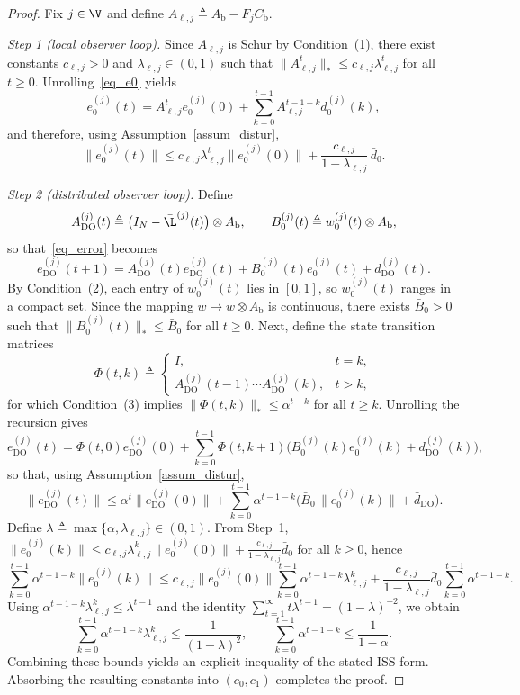 \begin{proof}
Fix $j\in\V$ and define $A_{\ell,j}\triangleq A_{\text{b}}-F_jC_{\text{b}}$.

\textit{Step 1 (local observer loop).}
Since $A_{\ell,j}$ is Schur by Condition~(1), there exist constants $c_{\ell,j}>0$ and $\lambda_{\ell,j}\in(0,1)$ such that $\|A_{\ell,j}^t\|_* \le c_{\ell,j}\lambda_{\ell,j}^t$ for all $t\ge 0$.
Unrolling~\eqref{eq_e0} yields
\[
e_0^{(j)}(t)=A_{\ell,j}^t e_0^{(j)}(0)+\sum_{k=0}^{t-1}A_{\ell,j}^{t-1-k} d_0^{(j)}(k),
\]
and therefore, using Assumption~\ref{assum_distur},
\[
\|e_0^{(j)}(t)\|
\le c_{\ell,j}\lambda_{\ell,j}^t\|e_0^{(j)}(0)\|+\frac{c_{\ell,j}}{1-\lambda_{\ell,j}}\,\bar d_{0}.
\]

\textit{Step 2 (distributed observer loop).}
Define
\[
A_{\mathrm{DO}}^{(j)}(t)\triangleq \big(I_N-\bar{\L}^{(j)}(t)\big)\otimes A_{\text{b}},\qquad
B_{0}^{(j)}(t)\triangleq w_0^{(j)}(t)\otimes A_{\text{b}},
\]
so that~\eqref{eq_error} becomes
\[
e_{\mathrm{DO}}^{(j)}(t+1)=A_{\mathrm{DO}}^{(j)}(t)e_{\mathrm{DO}}^{(j)}(t)+B_{0}^{(j)}(t)e_0^{(j)}(t)+d_{\mathrm{DO}}^{(j)}(t).
\]
By Condition~(2), each entry of $w_0^{(j)}(t)$ lies in $[0,1]$, so $w_0^{(j)}(t)$ ranges in a compact set.
Since the mapping $w\mapsto w\otimes A_{\text{b}}$ is continuous, there exists $\bar B_0>0$ such that $\|B_0^{(j)}(t)\|_*\le \bar B_0$ for all $t\ge 0$.
Next, define the state transition matrices
\[
\Phi(t,k)\triangleq
\begin{cases}
I, & t=k,\\
A_{\mathrm{DO}}^{(j)}(t-1)\cdots A_{\mathrm{DO}}^{(j)}(k), & t>k,
\end{cases}
\]
for which Condition~(3) implies $\|\Phi(t,k)\|_* \le \alpha^{t-k}$ for all $t\ge k$.
Unrolling the recursion gives
\[
e_{\mathrm{DO}}^{(j)}(t)=\Phi(t,0)e_{\mathrm{DO}}^{(j)}(0)+\sum_{k=0}^{t-1}\Phi(t,k+1)\Big(B_{0}^{(j)}(k)e_0^{(j)}(k)+d_{\mathrm{DO}}^{(j)}(k)\Big),
\]
so that, using Assumption~\ref{assum_distur},
\[
\|e_{\mathrm{DO}}^{(j)}(t)\|
\le \alpha^t\|e_{\mathrm{DO}}^{(j)}(0)\|
\!+\!\sum_{k=0}^{t-1}\alpha^{t-1-k}\Big(\bar B_0\,\|e_0^{(j)}(k)\|+\bar d_{\mathrm{DO}}\Big).
\]
Define $\lambda\triangleq \max\{\alpha,\lambda_{\ell,j}\}\in(0,1)$.
From Step~1, $\|e_0^{(j)}(k)\|\le c_{\ell,j}\lambda_{\ell,j}^k\|e_0^{(j)}(0)\|+\frac{c_{\ell,j}}{1-\lambda_{\ell,j}}\bar d_{0}$ for all $k\ge 0$, hence
\[
\sum_{k=0}^{t-1}\alpha^{t-1-k}\|e_0^{(j)}(k)\|
\le c_{\ell,j}\|e_0^{(j)}(0)\|\sum_{k=0}^{t-1}\alpha^{t-1-k}\lambda_{\ell,j}^k
\!+\!\frac{c_{\ell,j}}{1-\lambda_{\ell,j}}\bar d_{0}\sum_{k=0}^{t-1}\alpha^{t-1-k}.
\]
Using $\alpha^{t-1-k}\lambda_{\ell,j}^k\le \lambda^{t-1}$ and the identity $\sum_{t=1}^{\infty} t\lambda^{t-1}=(1-\lambda)^{-2}$, we obtain
\[
\sum_{k=0}^{t-1}\alpha^{t-1-k}\lambda_{\ell,j}^k \le \frac{1}{(1-\lambda)^2},
\qquad
\sum_{k=0}^{t-1}\alpha^{t-1-k}\le \frac{1}{1-\alpha}.
\]
Combining these bounds yields an explicit inequality of the stated ISS form. Absorbing the resulting constants into $(c_0,c_1)$ completes the proof.
\end{proof}

